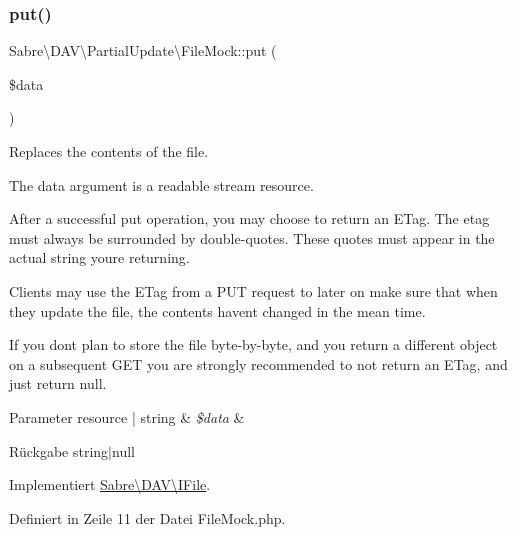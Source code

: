 \subsubsection{\texorpdfstring{put()}{put()}}
{\footnotesize\ttfamily Sabre\textbackslash{}\+D\+A\+V\textbackslash{}\+Partial\+Update\textbackslash{}\+File\+Mock\+::put (\begin{DoxyParamCaption}\item[{}]{\$data }\end{DoxyParamCaption})}

Replaces the contents of the file.

The data argument is a readable stream resource.

After a successful put operation, you may choose to return an E\+Tag. The etag must always be surrounded by double-\/quotes. These quotes must appear in the actual string you\textquotesingle{}re returning.

Clients may use the E\+Tag from a P\+UT request to later on make sure that when they update the file, the contents haven\textquotesingle{}t changed in the mean time.

If you don\textquotesingle{}t plan to store the file byte-\/by-\/byte, and you return a different object on a subsequent G\+ET you are strongly recommended to not return an E\+Tag, and just return null.


\begin{DoxyParams}[1]{Parameter}
resource | string & {\em \$data} & \\
\hline
\end{DoxyParams}
\begin{DoxyReturn}{Rückgabe}
string$\vert$null 
\end{DoxyReturn}


Implementiert \mbox{\hyperlink{interface_sabre_1_1_d_a_v_1_1_i_file_a0c30bc87b22d289f311c854f23993452}{Sabre\textbackslash{}\+D\+A\+V\textbackslash{}\+I\+File}}.



Definiert in Zeile 11 der Datei File\+Mock.\+php.

\mbox{\label{class_sabre_1_1_d_a_v_1_1_partial_update_1_1_file_mock_acf0b86fd1a91b7795bc565831f302f15}} 
